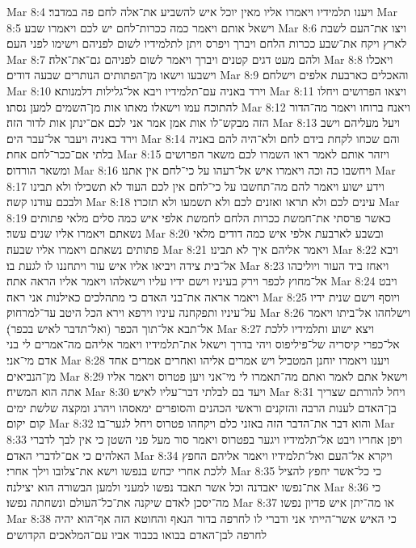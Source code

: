 Mar 8:4  ויענו תלמידיו ויאמרו אליו מאין יוכל איש להשביע את־אלה לחם פה במדבר׃
Mar 8:5  וישאל אותם ויאמר כמה ככרות־לחם יש לכם ויאמרו שבע׃
Mar 8:6  ויצו את־העם לשבת לארץ ויקח את־שבע ככרות הלחם ויברך ויפרס ויתן לתלמידיו לשום לפניהם וישימו לפני העם׃
Mar 8:7  ולהם מעט דגים קטנים ויברך ויאמר לשום לפניהם גם־את־אלה׃
Mar 8:8  ויאכלו וישבעו וישאו מן־הפתותים הנותרים שבעה דודים׃
Mar 8:9  והאכלים כארבעת אלפים וישלחם׃
Mar 8:10  וירד באניה עם־תלמידיו ויבא אל־גלילות דלמנותא׃
Mar 8:11  ויצאו הפרושים ויחלו להתוכח עמו וישאלו מאתו אות מן־השמים למען נסתו׃
Mar 8:12  ויאנח ברוחו ויאמר מה־הדור הזה מבקש־לו אות אמן אמר אני לכם אם־ינתן אות לדור הזה׃
Mar 8:13  ויעל מעליהם וישב וירד באניה ויעבר אל־עבר הים׃
Mar 8:14  והם שכחו לקחת בידם לחם ולא־היה להם באניה בלתי אם־ככר־לחם אחת׃
Mar 8:15  ויזהר אותם לאמר ראו השמרו לכם משאר הפרושים ומשאר הורדוס׃
Mar 8:16  ויחשבו כה וכה ויאמרו איש אל־רעהו על כי־לחם אין אתנו׃
Mar 8:17  וידע ישוע ויאמר להם מה־תחשבו על כי־לחם אין לכם העוד לא תשכילו ולא תבינו ולבכם עודנו קשה׃
Mar 8:18  עינים לכם ולא תראו ואזנים לכם ולא תשמעו ולא תזכרו׃
Mar 8:19  כאשר פרסתי את־חמשת ככרות הלחם לחמשת אלפי איש כמה סלים מלאי פתותים נשאתם ויאמרו אליו שנים עשר׃
Mar 8:20  ובשבע לארבעת אלפי איש כמה דודים מלאי פתותים נשאתם ויאמרו אליו שבעה׃
Mar 8:21  ויאמר אליהם איך לא תבינו׃
Mar 8:22  ויבא אל־בית צידה ויביאו אליו איש עור ויתחננו לו לגעת בו׃
Mar 8:23  ויאחז ביד העור ויוליכהו אל־מחוץ לכפר וירק בעיניו וישם ידיו עליו וישאלהו ויאמר אליו הראה אתה׃
Mar 8:24  ויבט ויאמר אראה את־בני האדם כי מתהלכים כאילנות אני ראה׃
Mar 8:25  ויוסף וישם שנית ידיו על־עיניו ותפקחנה עיניו וירפא וירא הכל היטב עד־למרחוק׃
Mar 8:26  וישלחהו אל־ביתו ויאמר אל־תבא אל־תוך הכפר (ואל־תדבר לאיש בכפר)׃
Mar 8:27  ויצא ישוע ותלמידיו ללכת אל־כפרי קיסריה של־פיליפוס ויהי בדרך וישאל את־תלמידיו ויאמר אליהם מה־אמרים לי בני אדם מי־אני׃
Mar 8:28  ויענו ויאמרו יוחנן המטביל ויש אמרים אליהו ואחרים אמרים אחד מן־הנביאים׃
Mar 8:29  וישאל אתם לאמר ואתם מה־תאמרו לי מי־אני ויען פטרוס ויאמר אליו אתה הוא המשיח׃
Mar 8:30  ויעד בם לבלתי דבר־עליו לאיש׃
Mar 8:31  ויחל להורתם שצריך בן־האדם לענות הרבה והזקנים וראשי הכהנים והסופרים ימאסהו ויהרג ומקצה שלשת ימים קום יקום׃
Mar 8:32  והוא דבר את־הדבר הזה באזני כלם ויקחהו פטרוס ויחל לגער־בו׃
Mar 8:33  ויפן אחריו ויבט אל־תלמידיו ויגער בפטרוס ויאמר סור מעל פני השטן כי אין לבך לדברי האלהים כי אם־לדברי האדם׃
Mar 8:34  ויקרא אל־העם ואל־תלמידיו ויאמר אליהם החפץ ללכת אחרי יכחש בנפשו וישא את־צלובו וילך אחרי׃
Mar 8:35  כי כל־אשר יחפץ להציל את־נפשו יאבדנה וכל אשר תאבד נפשו למעני ולמען הבשורה הוא יצילנה׃
Mar 8:36  כי מה־יסכן לאדם שיקנה את־כל־העולם ונשחתה נפשו׃
Mar 8:37  או מה־יתן איש פדיון נפשו׃
Mar 8:38  כי האיש אשר־הייתי אני ודברי לו לחרפה בדור הנאף והחוטא הזה אף־הוא יהיה לחרפה לבן־האדם בבואו בכבוד אביו עם־המלאכים הקדושים׃
